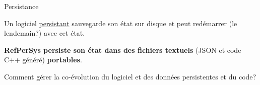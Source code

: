 \documentclass[final,a4,xcolor={svgnames,dvipsnames}]{beamer}
\begin{document}
 \begin{frame}{Persistance}

   Un logiciel
   \href{https://fr.wikipedia.org/wiki/Persistance_(informatique)}{persistant}
   sauvegarde son état sur disque et peut redémarrer (le lendemain?)
   avec cet état.

   \bigskip

   \textbf{RefPerSys persiste son état dans des fichiers textuels} (JSON et
   code C++ généré) \textbf{portables}.

   \bigskip

   Comment gérer la co-évolution du logiciel et des données
   persistentes et du code?
   
 \end{frame}

%
%
 
\end{document}
